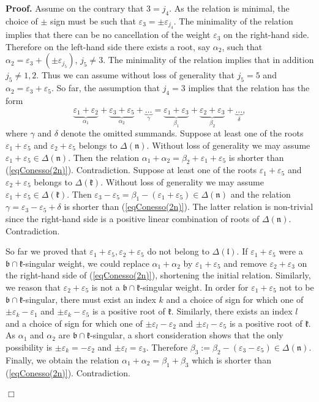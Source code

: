 \documentclass[12pt]{report}
\newenvironment{proof}[1][]{ \textbf{Proof#1. }}{$\Box$\medskip}
\newcommand{\kk}{\mathfrak{k}}
\newcommand{\nn}{\mathfrak{n}}
\newcommand{\bb}{\mathfrak{b}}
\newcommand{\lL}{\mathfrak{l}}
\newcommand{\refeq}[1]{(\ref{#1})}
\newcommand{\eps}{\varepsilon}
\newcommand{\pmf}[1]{ \pm}%
\begin{document}
\begin{proof}
Assume on the contrary that $3=j_4$. As the relation is minimal, the choice of $\pmf{j_4}$ sign must be such that $\eps_{3}= \pmf{j_4} \eps_{j_4}$. The minimality of the relation implies that there can be no cancellation of the weight $\eps_{3}$ on the right-hand side. Therefore on the left-hand side there exists a root, say $\alpha_2$, such that $\alpha_2=\eps_{3}+(\pmf{j_5}\eps_{j_5})$, $j_5\neq 3$. The minimality of the relation implies that in addition $j_5\neq 1,2$. Thus we can assume without loss of generality that $j_5=5$ and $\alpha_2=\eps_3+\eps_5$. So far, the assumption that $j_4=3$ implies that the relation has the form
\begin{equation}\label{eqConesso(2n)}
\underbrace{\eps_{1}+\eps_{2}}_{\alpha_1}+\underbrace{ \eps_{3}+\eps_{5}}_{\alpha_{2}}+\underbrace{\dots}_{\gamma}= \underbrace{\eps_{1}+\eps_{3}}_{\beta_1}+\underbrace{ \eps_{2} +\eps_{3}}_{\beta_2}+\underbrace{\dots}_{\delta},
\end{equation}
where $\gamma$ and $\delta$ denote the omitted summands. Suppose at least one of the roots $\eps_{1}+\eps_{5}$ and $\eps_{2} +\eps_{5}$ belongs to $\Delta(\nn)$. Without loss of generality we may assume $\eps_{1} +\eps_{5} \in\Delta(\nn)$. Then the relation $\alpha_1+\alpha_2= \beta_{2}+ \eps_{ 1} +\eps_{5}$ is shorter than \refeq{eqConesso(2n)}. Contradiction. Suppose at least one of the roots $\eps_{1}+\eps_{5}$ and $\eps_{2}+\eps_{5}$ belongs to $\Delta(\kk)$. Without loss of generality we may assume $\eps_{1}+\eps_{5}\in\Delta(\kk)$. Then $\eps_{3} - \eps_{5}= \beta_1 -( \eps_{1} + \eps_{5}) \in \Delta(\nn)$ and the relation $\gamma= \eps_{3} - \eps_{5}+\delta$ is shorter than \refeq{eqConesso(2n)}. The latter relation is non-trivial since the right-hand side is a positive linear combination of roots of $\Delta(\nn)$. Contradiction.

So far we proved that $\eps_{1}+\eps_{5},\eps_{2} +\eps_{5}$ do not belong to $\Delta(\lL)$. If $\eps_{1} + \eps_{5}$ were a $\bb\cap\kk$-singular weight, we could replace $\alpha_1+\alpha_2$ by $\eps_{1} + \eps_{5}$ and remove $ \eps_{ 2} + \eps_{3}$ on the right-hand side of \refeq{eqConesso(2n)}, shortening the initial relation. Similarly, we reason that $\eps_{2}+\eps_{5}$ is not a $\bb\cap\kk$-singular weight. In order for $\eps_{ 1}+\eps_{5}$ not to be $\bb\cap\kk$-singular, there must exist an index $k$ and a choice of sign for which one of $\pmf{k}\eps_{k} -\eps_{ 1}$ and $\pmf{k}\eps_{k}-\eps_{5}$ is a positive root of $\kk$. Similarly, there exists an index $l$ and a choice of sign for which one of $\pmf{l}\eps_{l} -\eps_{ 2}$ and $\pmf{l}\eps_{l}-\eps_{5}$ is a positive root of $\kk$. As $\alpha_1$ and $ \alpha_2 $ are $\bb\cap\kk$-singular, a short consideration shows that the only possibility is $\pmf{k}\eps_k=-\eps_2$ and $\pmf{l}\eps_l=\eps_{3}$. Therefore $\beta_3 := \beta_2 -(\eps_{3}-\eps_{5})\in \Delta(\nn)$. Finally, we obtain the relation $\alpha_1+\alpha_2=\beta_1+\beta_3$ which is shorter than \refeq{eqConesso(2n)}. Contradiction.


\end{proof}
\end{document}
